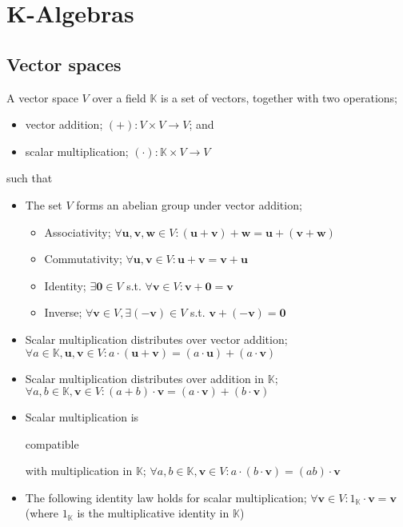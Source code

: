 \documentclass{article}
\newenvironment{itemized}{ 
\begin{itemize}
\setlength{\itemsep}{0pt}
\setlength{\parskip}{0pt}
\setlength{\parsep}{0pt}     
}{\end{itemize}}
\renewcommand{\vec}[1]{\mathbf{#1}}
\begin{document}
\section*{K-Algebras}

\subsection*{Vector spaces}

A vector space $V$ over a field $\mathbb{K}$ is a set of vectors, together with two operations; 

  \begin{itemized}
    \item vector addition; $ (+) : V \times V \rightarrow V $; and
    \item scalar multiplication; $ (\cdot) : \mathbb{K} \times V \rightarrow V $
  \end{itemized}

such that 
  
  \begin{itemized}
    \item The set $V$ forms an abelian group under vector addition;
      \begin{itemized}
        \item Associativity; $ \forall \vec{u}, \vec{v}, \vec{w} \in V : (\vec{u} + \vec{v}) + \vec{w} = \vec{u} + (\vec{v} + \vec{w}) $
        \item Commutativity; $ \forall \vec{u}, \vec{v} \in V : \vec{u} + \vec{v} = \vec{v} + \vec{u} $
        \item Identity; $ \exists \vec{0} \in V $ s.t. $ \forall \vec{v} \in V : \vec{v} + \vec{0} = \vec{v} $
        \item Inverse; $ \forall \vec{v} \in V, \exists \vec{(-v)} \in V $ s.t. $ \vec{v} + \vec{(-v)} = \vec{0} $
      \end{itemized}
    \item Scalar multiplication distributes over vector addition; $ \forall a \in \mathbb{K}, \vec{u}, \vec{v} \in V : a \cdot (\vec{u} + \vec{v}) = (a \cdot \vec{u}) + (a \cdot \vec{v}) $
    \item Scalar multiplication distributes over addition in $\mathbb{K}$; $ \forall a, b \in \mathbb{K}, \vec{v} \in V : (a + b) \cdot \vec{v} = (a \cdot \vec{v}) + (b \cdot \vec{v}) $
    \item Scalar multiplication is \begin{em}compatible\end{em} with multiplication in $\mathbb{K}$; $ \forall a,b \in \mathbb{K}, \vec{v} \in V : a \cdot (b \cdot \vec{v}) = (ab) \cdot \vec{v} $ 
    \item The following identity law holds for scalar multiplication; $ \forall \vec{v} \in V : 1_{\mathbb{K}} \cdot \vec{v} = \vec{v} $ (where $1_{\mathbb{K}}$ is the multiplicative identity in $\mathbb{K}$)
  \end{itemized}
\end{document}
